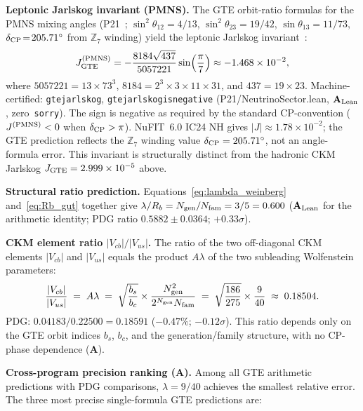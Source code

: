 \documentclass[11pt]{article}
\theoremstyle{remark}
\newcommand{\Ngen}{N_{\rm gen}}
\newcommand{\Nfam}{N_{\rm fam}}
\newcommand{\lean}[1]{%
  \penalty-100
  \begingroup\def\_{\textunderscore\allowbreak}\texttt{#1}\endgroup}
\newcommand{\lam}{\lambda}
\newcommand{\bc}{b_c}
\newcommand{\bs}{b_s}
\newcommand{\Rb}{R_b}
\newcommand{\CatA}{\textbf{A}}
\newcommand{\CatAL}{\ensuremath{\textbf{A}_{\rm Lean}}}
\begin{document}
\medskip

\textbf{Leptonic Jarlskog invariant (PMNS).}
The GTE orbit-ratio formulas for the PMNS mixing angles (P21~\cite{SpivackNeutrino};
$\sin^2\!\theta_{12}\!=\!4/13$, $\sin^2\!\theta_{23}\!=\!19/42$, $\sin\theta_{13}\!=\!11/73$,
$\delta_{\rm CP}\!=\!205.71^\circ$ from $\mathbb{Z}_7$ winding)
yield the leptonic Jarlskog invariant~\cite{Jarlskog1985}:
\begin{equation}
  J_{\rm GTE}^{(\rm PMNS)} = -\frac{8184\sqrt{437}}{5057221}\sin\!\left(\frac{\pi}{7}\right)
  \approx -1.468\times10^{-2},
  \label{eq:jarlskog_pmns}
\end{equation}
where $5057221 = 13 \times 73^3$, $8184 = 2^3 \times 3 \times 11 \times 31$, and
$437 = 19\times 23$.
Machine-certified: \lean{gte\_jarlskog}, \lean{gte\_jarlskog\_is\_negative}
(P21/NeutrinoSector.lean, $\CatAL$, zero~\texttt{sorry}).
The sign is negative as required by the standard CP-convention
($J^{(\rm PMNS)} < 0$ when $\delta_{\rm CP} > \pi$).
NuFIT~6.0 IC24 NH gives $|J| \approx 1.78\times10^{-2}$;
the GTE prediction reflects the $\mathbb{Z}_7$ winding value $\delta_{\rm CP} = 205.71^\circ$,
not an angle-formula error. This invariant is structurally distinct from the hadronic
CKM Jarlskog $J_{\rm GTE} = 2.999\times10^{-5}$ above.

\medskip

\textbf{Structural ratio prediction.}
Equations~\eqref{eq:lambda_weinberg} and~\eqref{eq:Rb_gut} together give
$\lam/\Rb = \Ngen/\Nfam = 3/5 = 0.600$ ($\CatAL$ for the arithmetic identity;
PDG ratio $0.5882\pm 0.0364$; $+0.33\sigma$).

\medskip

\textbf{CKM element ratio $|V_{cb}|/|V_{us}|$.}
The ratio of the two off-diagonal CKM elements $|V_{cb}|$ and $|V_{us}|$ equals the
product $A\lam$ of the two subleading Wolfenstein parameters:
\[
  \frac{|V_{cb}|}{|V_{us}|} \;=\; A\lam
  \;=\; \sqrt{\frac{\bs}{\bc}}\times\frac{\Ngen^2}{2^{\Ngen}\Nfam}
  \;=\; \sqrt{\frac{186}{275}}\times\frac{9}{40}
  \;\approx\; 0.18504.
\]
PDG: $0.04183/0.22500 = 0.18591$ ($-0.47\%$; $-0.12\sigma$).
This ratio depends only on the GTE orbit indices $\bs$, $\bc$, and the generation/family
structure, with no CP-phase dependence ($\CatA$).

\medskip

\textbf{Cross-program precision ranking ($\CatA$).}
Among all GTE arithmetic predictions with PDG comparisons, $\lam = 9/40$ achieves
the smallest relative error.
The three most precise single-formula GTE predictions are:
\end{document}
